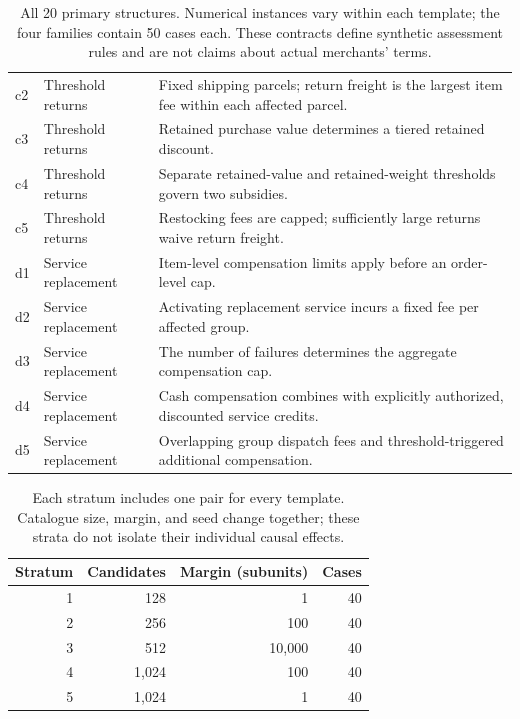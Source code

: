 \documentclass[11pt]{article}
\begin{document}
\begin{table}[!tbp]
\begin{tabular}{llp{10.4cm}}
c2 & Threshold returns & Fixed shipping parcels; return freight is the largest item fee within each affected parcel.\\
c3 & Threshold returns & Retained purchase value determines a tiered retained discount.\\
c4 & Threshold returns & Separate retained-value and retained-weight thresholds govern two subsidies.\\
c5 & Threshold returns & Restocking fees are capped; sufficiently large returns waive return freight.\\
\midrule
d1 & Service replacement & Item-level compensation limits apply before an order-level cap.\\
d2 & Service replacement & Activating replacement service incurs a fixed fee per affected group.\\
d3 & Service replacement & The number of failures determines the aggregate compensation cap.\\
d4 & Service replacement & Cash compensation combines with explicitly authorized, discounted service credits.\\
d5 & Service replacement & Overlapping group dispatch fees and threshold-triggered additional compensation.\\
\bottomrule
\end{tabular}
\caption{All 20 primary structures. Numerical instances vary within each template; the four families contain 50 cases each. These contracts define synthetic assessment rules and are not claims about actual merchants' terms.}
\label{tab:templates}
\end{table}

\begin{table}[!htbp]
\centering\small
\begin{tabular}{rrrr}
\toprule
Stratum & Candidates & Margin (subunits) & Cases\\
\midrule
1 & 128 & 1 & 40\\
2 & 256 & 100 & 40\\
3 & 512 & 10,000 & 40\\
4 & 1,024 & 100 & 40\\
5 & 1,024 & 1 & 40\\
\bottomrule
\end{tabular}
\caption{Each stratum includes one pair for every template. Catalogue size, margin, and seed change together; these strata do not isolate their individual causal effects.}
\label{tab:strata}
\end{table}
\end{document}
